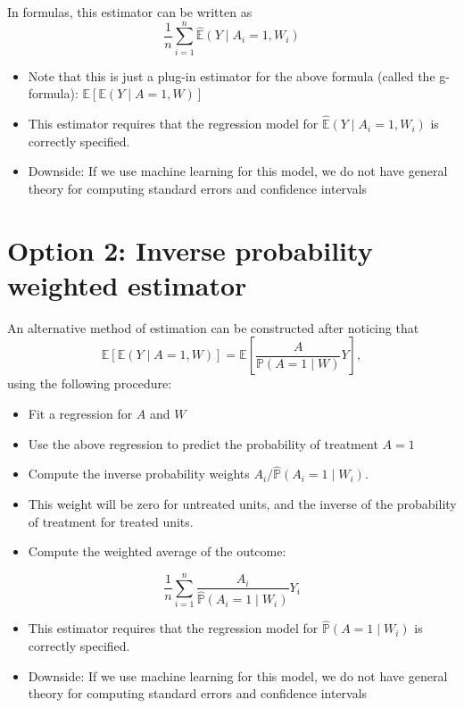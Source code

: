 \documentclass[
  12pt,
]{book}
\providecommand{\tightlist}{%
  \setlength{\itemsep}{0pt}\setlength{\parskip}{0pt}}
\theoremstyle{definition}
\theoremstyle{definition}
\theoremstyle{definition}
\renewcommand{\P}{\mathbb{P}}
\newcommand{\E}{\mathbb{E}}
\newcommand{\1}{\mathbbm{1}}
\begin{document}
In formulas, this estimator can be written as
\[\frac{1}{n} \sum_{i=1}^n \hat{\E}(Y \mid A_i=1, W_i)\]

\begin{itemize}
\tightlist
\item
  Note that this is just a plug-in estimator for the above formula (called the
  g-formula): \(\E[\E(Y \mid A=1, W)]\)
\item
  This estimator requires that the regression model for \(\hat{\E}(Y \mid A_i=1, W_i)\) is correctly specified.
\item
  Downside: If we use machine learning for this model, we do not have general
  theory for computing standard errors and confidence intervals
\end{itemize}

\hypertarget{option-2-inverse-probability-weighted-estimator}{%
\section{Option 2: Inverse probability weighted estimator}\label{option-2-inverse-probability-weighted-estimator}}

An alternative method of estimation can be constructed after noticing that
\[\E[\E(Y \mid A=1, W)] = \E \left[\frac{A}{\P(A=1\mid W)} Y \right],\]
using the following procedure:

\begin{itemize}
\tightlist
\item
  Fit a regression for \(A\) and \(W\)
\item
  Use the above regression to predict the probability of treatment \(A=1\)
\item
  Compute the inverse probability weights \(A_i / \hat{\P}(A_i =1 \mid W_i)\).
\item
  This weight will be zero for untreated units, and the inverse of the
  probability of treatment for treated units.
\item
  Compute the weighted average of the outcome:
\end{itemize}

\[\frac{1}{n} \sum_{i=1}^n \frac{A_i}{\hat{\P}(A_i=1 \mid W_i)} Y_i\]

\begin{itemize}
\tightlist
\item
  This estimator requires that the regression model for \(\hat{\P}(A=1 \mid W_i)\)
  is correctly specified.
\item
  Downside: If we use machine learning for this model, we do not have general
  theory for computing standard errors and confidence intervals
\end{itemize}
\end{document}

